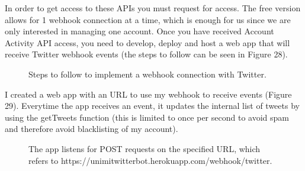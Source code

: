 \documentclass[12pt]{article} %
\begin{document}
\begin{enumerate}
		In order to get access to these APIs you must request for access. The free version allows for 1 webhook connection at a time, which is enough for us since
		we are only interested in managing one account. Once you have received Account Activity API access, you need to develop, deploy and host a web app 
		that will receive Twitter webhook events (the steps to follow can be seen in Figure 28).

		\begin{figure}[H] %
		\caption{Steps to follow to implement a webhook connection with Twitter.}
		\label{accountActivitySteps}
		\end{figure}

		I created a web app with an URL to use my webhook to receive events (Figure 29). Everytime the app receives an event, it updates the internal list of tweets by using the 				getTweets function (this is limited to once per second to avoid spam and therefore avoid blacklisting of my account).

		\begin{figure}[H] %
		\caption{The app listens for POST requests on the specified URL, which refers to https://unimitwitterbot.herokuapp.com/webhook/twitter.}
		\label{webhookPOST}
		\end{figure}


\end{enumerate}
\end{document}

